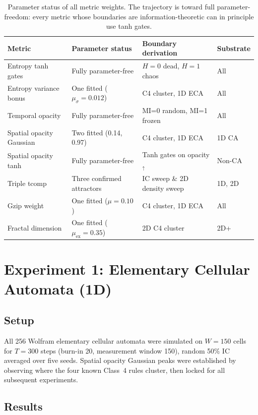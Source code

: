 \documentclass[12pt,a4paper]{article}
\begin{document}
\begin{table}[h]
\centering
\caption{Parameter status of all metric weights. The trajectory
  is toward full parameter-freedom: every metric whose boundaries are
  information-theoretic can in principle use tanh gates.}
\begin{tabular}{llll}
\toprule
Metric & Parameter status & Boundary derivation & Substrate \\
\midrule
Entropy tanh gates & Fully parameter-free
  & $H=0$ dead, $H=1$ chaos & All \\
Entropy variance bonus & One fitted ($\mu_\sigma=0.012$)
  & C4 cluster, 1D ECA & All \\
Temporal opacity & Fully parameter-free
  & MI=0 random, MI=1 frozen & All \\
Spatial opacity Gaussian & Two fitted (0.14, 0.97)
  & C4 cluster, 1D ECA & 1D CA \\
Spatial opacity tanh & Fully parameter-free
  & Tanh gates on opacity$_\uparrow$ & Non-CA \\
Triple tcomp & Three confirmed attractors
  & IC sweep \& 2D density sweep & 1D, 2D \\
Gzip weight & One fitted ($\mu=0.10$)
  & C4 cluster, 1D ECA & All \\
Fractal dimension & One fitted ($\mu_\text{ex}=0.35$)
  & 2D C4 cluster & 2D+ \\
\bottomrule
\end{tabular}
\end{table}

\section{Experiment 1: Elementary Cellular Automata (1D)}

\subsection{Setup}

All 256 Wolfram elementary cellular automata were simulated on
$W=150$ cells for $T=300$ steps (burn-in 20, measurement window 150),
random 50\% IC averaged over five seeds.
Spatial opacity Gaussian peaks were established by observing where the
four known Class~4 rules cluster, then locked for all subsequent
experiments.

\subsection{Results}
\end{document}
